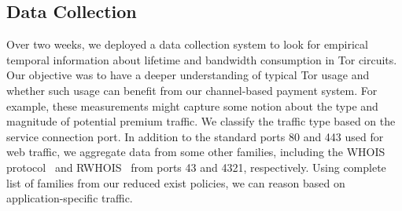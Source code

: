 \subsection{Data Collection}
\label{subsec:datacollection}

Over two weeks, we deployed a data collection system to look for empirical temporal information about lifetime and bandwidth consumption in Tor circuits.
Our objective was to have a deeper understanding of typical Tor usage and whether such usage can benefit from our channel-based payment system.
For example, these measurements might capture some notion about the type and magnitude of potential premium traffic.
We classify the traffic type based on the service connection port.
In addition to the standard ports 80 and 443 used for web traffic, we aggregate data from some other families, including the WHOIS protocol~\cite{daigle2004whois} and RWHOIS~\cite{williamson1994referral} from ports 43 and 4321, respectively.
Using complete list of families from our reduced exist policies, we can reason based on application-specific traffic.

